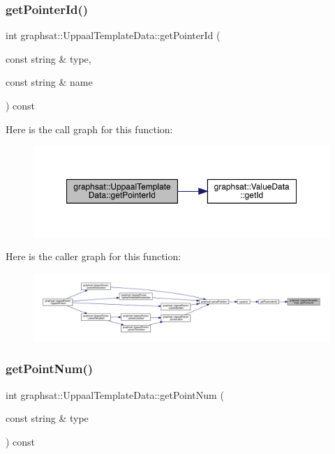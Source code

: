 \subsubsection{\texorpdfstring{getPointerId()}{getPointerId()}}
{\footnotesize\ttfamily int graphsat\+::\+Uppaal\+Template\+Data\+::get\+Pointer\+Id (\begin{DoxyParamCaption}\item[{const string \&}]{type,  }\item[{const string \&}]{name }\end{DoxyParamCaption}) const\hspace{0.3cm}{\ttfamily [inline]}}

Here is the call graph for this function\+:
\nopagebreak
\begin{figure}[H]
\begin{center}
\leavevmode
\includegraphics[width=350pt]{classgraphsat_1_1_uppaal_template_data_a30174d5936a6f73a36556310f1a30a99_cgraph}
\end{center}
\end{figure}
Here is the caller graph for this function\+:
\nopagebreak
\begin{figure}[H]
\begin{center}
\leavevmode
\includegraphics[width=350pt]{classgraphsat_1_1_uppaal_template_data_a30174d5936a6f73a36556310f1a30a99_icgraph}
\end{center}
\end{figure}
\mbox{\label{classgraphsat_1_1_uppaal_template_data_aeaaf6edf94a9f282e78c25faac74b63e}} 
\subsubsection{\texorpdfstring{getPointNum()}{getPointNum()}}
{\footnotesize\ttfamily int graphsat\+::\+Uppaal\+Template\+Data\+::get\+Point\+Num (\begin{DoxyParamCaption}\item[{const string \&}]{type }\end{DoxyParamCaption}) const\hspace{0.3cm}{\ttfamily [inline]}}

